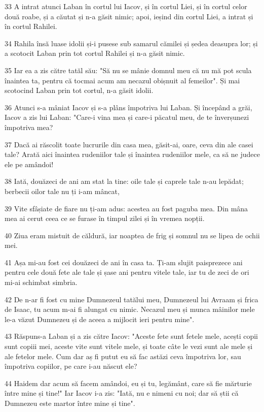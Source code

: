\par 33 A intrat atunci Laban în cortul lui Iacov, și în cortul Liei, și în cortul celor două roabe, și a căutat și n-a găsit nimic; apoi, ieșind din cortul Liei, a intrat și în cortul Rahilei.
\par 34 Rahila însă luase idolii și-i pusese sub samarul cămilei și ședea deasupra lor; și a scotocit Laban prin tot cortul Rahilei și n-a găsit nimic.
\par 35 Iar ea a zis către tatăl său: "Să nu se mânie domnul meu că nu mă pot scula înaintea ta, pentru că tocmai acum am necazul obișnuit al femeilor". Și mai scotocind Laban prin tot cortul, n-a găsit idolii.
\par 36 Atunci s-a mâniat Iacov și s-a plâns împotriva lui Laban. Și începând a grăi, Iacov a zis lui Laban: "Care-i vina mea și care-i păcatul meu, de te înverșunezi împotriva mea?
\par 37 Dacă ai răscolit toate lucrurile din casa mea, găsit-ai, oare, ceva din ale casei tale? Arată aici înaintea rudeniilor tale și înaintea rudeniilor mele, ca să ne judece ele pe amândoi!
\par 38 Iată, douăzeci de ani am stat la tine: oile tale și caprele tale n-au lepădat; berbecii oilor tale nu ți i-am mâncat,
\par 39 Vite sfâșiate de fiare nu ți-am adus: acestea au fost paguba mea. Din mâna mea ai cerut ceea ce se furase în timpul zilei și în vremea nopții.
\par 40 Ziua eram mistuit de căldură, iar noaptea de frig și somnul nu se lipea de ochii mei.
\par 41 Așa mi-au fost cei douăzeci de ani în casa ta. Ți-am slujit paisprezece ani pentru cele două fete ale tale și șase ani pentru vitele tale, iar tu de zeci de ori mi-ai schimbat simbria.
\par 42 De n-ar fi fost cu mine Dumnezeul tatălui meu, Dumnezeul lui Avraam și frica de Isaac, tu acum m-ai fi alungat cu nimic. Necazul meu și munca mâinilor mele le-a văzut Dumnezeu și de aceea a mijlocit ieri pentru mine".
\par 43 Răspuns-a Laban și a zis către Iacov: "Aceste fete sunt fetele mele, acești copii sunt copiii mei, aceste vite sunt vitele mele, și toate câte le vezi sunt ale mele și ale fetelor mele. Cum dar aș fi putut eu să fac astăzi ceva împotriva lor, sau împotriva copiilor, pe care i-au născut ele?
\par 44 Haidem dar acum să facem amândoi, eu și tu, legământ, care să fie mărturie între mine și tine!" Iar Iacov i-a zis: "Iată, nu e nimeni cu noi; dar să știi că Dumnezeu este martor între mine și tine".
